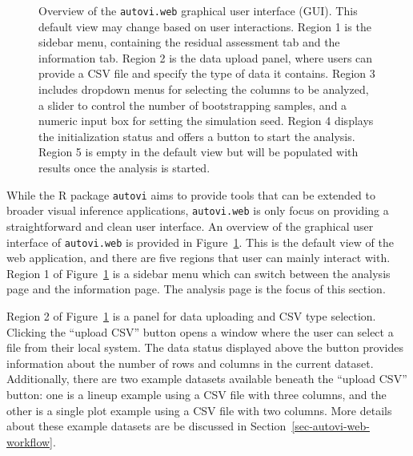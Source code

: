 \documentclass[
doublespace,
  times]{anzsauth}
\begin{document}
\begin{figure}


\caption{\label{fig-autovi-web}Overview of the \texttt{autovi.web}
graphical user interface (GUI). This default view may change based on
user interactions. Region 1 is the sidebar menu, containing the residual
assessment tab and the information tab. Region 2 is the data upload
panel, where users can provide a CSV file and specify the type of data
it contains. Region 3 includes dropdown menus for selecting the columns
to be analyzed, a slider to control the number of bootstrapping samples,
and a numeric input box for setting the simulation seed. Region 4
displays the initialization status and offers a button to start the
analysis. Region 5 is empty in the default view but will be populated
with results once the analysis is started.}

\end{figure}%

While the R package \texttt{autovi} aims to provide tools that can be
extended to broader visual inference applications, \texttt{autovi.web}
is only focus on providing a straightforward and clean user interface.
An overview of the graphical user interface of \texttt{autovi.web} is
provided in Figure~\ref{fig-autovi-web}. This is the default view of the
web application, and there are five regions that user can mainly
interact with. Region 1 of Figure~\ref{fig-autovi-web} is a sidebar menu
which can switch between the analysis page and the information page. The
analysis page is the focus of this section.

Region 2 of Figure~\ref{fig-autovi-web} is a panel for data uploading
and CSV type selection. Clicking the ``upload CSV'' button opens a
window where the user can select a file from their local system. The
data status displayed above the button provides information about the
number of rows and columns in the current dataset. Additionally, there
are two example datasets available beneath the ``upload CSV'' button:
one is a lineup example using a CSV file with three columns, and the
other is a single plot example using a CSV file with two columns. More
details about these example datasets are be discussed in
Section~\ref{sec-autovi-web-workflow}.
\end{document}

